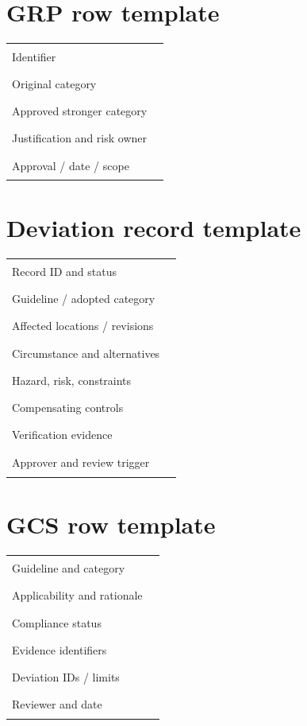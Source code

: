 \documentclass[10pt,letterpaper]{article}
\begin{document}
\section{GRP row template}
\begin{tabularx}{\linewidth}{@{}p{.29\linewidth}X@{}}\toprule
Identifier & \rule{.62\linewidth}{.3pt}\\
Original category & \rule{.62\linewidth}{.3pt}\\
Approved stronger category & \rule{.62\linewidth}{.3pt}\\
Justification and risk owner & \rule{.62\linewidth}{.3pt}\\
Approval / date / scope & \rule{.62\linewidth}{.3pt}\\\bottomrule\end{tabularx}
\section{Deviation record template}
\begin{tabularx}{\linewidth}{@{}p{.28\linewidth}X@{}}\toprule
Record ID and status & \rule{.65\linewidth}{.3pt}\\
Guideline / adopted category & \rule{.65\linewidth}{.3pt}\\
Affected locations / revisions & \rule{.65\linewidth}{.3pt}\\
Circumstance and alternatives & \rule{.65\linewidth}{.3pt}\\
Hazard, risk, constraints & \rule{.65\linewidth}{.3pt}\\
Compensating controls & \rule{.65\linewidth}{.3pt}\\
Verification evidence & \rule{.65\linewidth}{.3pt}\\
Approver and review trigger & \rule{.65\linewidth}{.3pt}\\\bottomrule\end{tabularx}
\section{GCS row template}
\begin{tabularx}{\linewidth}{@{}p{.3\linewidth}X@{}}\toprule
Guideline and category & \rule{.64\linewidth}{.3pt}\\
Applicability and rationale & \rule{.64\linewidth}{.3pt}\\
Compliance status & \rule{.64\linewidth}{.3pt}\\
Evidence identifiers & \rule{.64\linewidth}{.3pt}\\
Deviation IDs / limits & \rule{.64\linewidth}{.3pt}\\
Reviewer and date & \rule{.64\linewidth}{.3pt}\\\bottomrule\end{tabularx}
\end{document}
